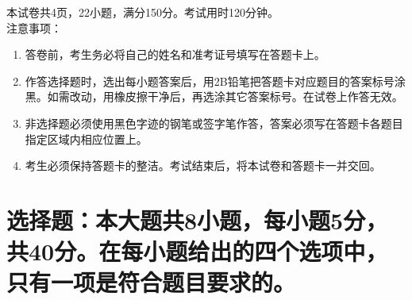 \documentclass[11pt,space]{ctexart} %
\begin{document}
\juemi %
本试卷共4页，22小题，满分150分。考试用时120分钟。\\
{\heiti 注意事项}：
\begin{enumerate}[itemsep=-0.3em,topsep=0pt]
\item 答卷前，考生务必将自己的姓名和准考证号填写在答题卡上。
\item 作答选择题时，选出每小题答案后，用2B铅笔把答题卡对应题目的答案标号涂黑。如需改动，用橡皮擦干净后，再选涂其它答案标号。在试卷上作答无效。
\item 非选择题必须使用黑色字迹的钢笔或签字笔作答，答案必须写在答题卡各题目指定区域内相应位置上。
\item 考生必须保持答题卡的整洁。考试结束后，将本试卷和答题卡一并交回。	
\end{enumerate}

\section{选择题：本大题共8小题，每小题5分，共40分。在每小题给出的四个选项中，只有一项是符合题目要求的。}
\end{document}
